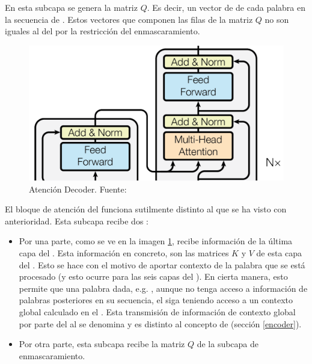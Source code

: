En esta subcapa se genera la matriz $Q$. Es decir, un vector de  de cada palabra en la secuencia de . Estos vectores que componen las filas de la matriz $Q$ no son iguales al del  por la restricción del enmascaramiento.

\label{atencion_decoder}
\begin{figure}[H]
    \centering
    \includegraphics{imgs/trans_arq_6.png}
    \caption{Atención Decoder. \scriptsize{Fuente: \parencite{transformers}}}
    \label{atencion_decoderf}
\end{figure}

El bloque de atención del  funciona sutilmente distinto al que se ha visto con anterioridad. Esta subcapa recibe dos :
\begin{itemize}
    \item Por una parte, como se ve en la imagen \ref{atencion_decoderf}, recibe información de la última capa del . Esta información en concreto, son las matrices $K$ y $V$ de esta capa del . Esto se hace con el motivo de aportar contexto de la palabra que se está procesado (y esto ocurre para las seis capas del ). En cierta manera, esto permite que una palabra dada, e.g. \ul{}, aunque no tenga acceso a información de palabras posteriores en su secuencia, el  siga teniendo acceso a un contexto global calculado en el . Esta transmisión de información de contexto global por parte del  al  se denomina  y es distinto al concepto de  (sección \ref{encoder}).
    \item Por otra parte, esta subcapa recibe la matriz $Q$ de la subcapa de enmascaramiento.
\end{itemize}

